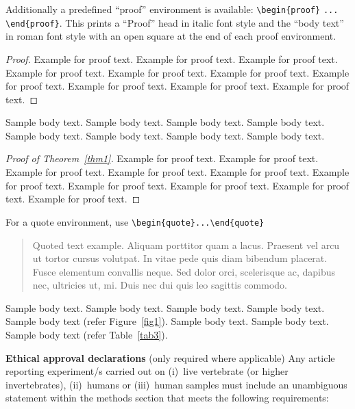 \documentclass[pdflatex,sn-mathphys-num]{sn-jnl}%
\theoremstyle{thmstyleone}%
\theoremstyle{thmstyletwo}%
\theoremstyle{thmstylethree}%
\begin{document}
Additionally a predefined ``proof'' environment is available: \verb+\begin{proof}+ \verb+...+ \verb+\end{proof}+. This prints a ``Proof'' head in italic font style and the ``body text'' in roman font style with an open square at the end of each proof environment. 

\begin{proof}
Example for proof text. Example for proof text. Example for proof text. Example for proof text. Example for proof text. Example for proof text. Example for proof text. Example for proof text. Example for proof text. Example for proof text. 
\end{proof}

Sample body text. Sample body text. Sample body text. Sample body text. Sample body text. Sample body text. Sample body text. Sample body text.

\begin{proof}[Proof of Theorem~{\upshape\ref{thm1}}]
Example for proof text. Example for proof text. Example for proof text. Example for proof text. Example for proof text. Example for proof text. Example for proof text. Example for proof text. Example for proof text. Example for proof text. 
\end{proof}

\noindent
For a quote environment, use \verb+\begin{quote}...\end{quote}+
\begin{quote}
Quoted text example. Aliquam porttitor quam a lacus. Praesent vel arcu ut tortor cursus volutpat. In vitae pede quis diam bibendum placerat. Fusce elementum
convallis neque. Sed dolor orci, scelerisque ac, dapibus nec, ultricies ut, mi. Duis nec dui quis leo sagittis commodo.
\end{quote}

Sample body text. Sample body text. Sample body text. Sample body text. Sample body text (refer Figure~\ref{fig1}). Sample body text. Sample body text. Sample body text (refer Table~\ref{tab3}). 







\textbf{Ethical approval declarations} (only required where applicable) Any article reporting experiment/s carried out on (i)~live vertebrate (or higher invertebrates), (ii)~humans or (iii)~human samples must include an unambiguous statement within the methods section that meets the following requirements: 
\end{document}
